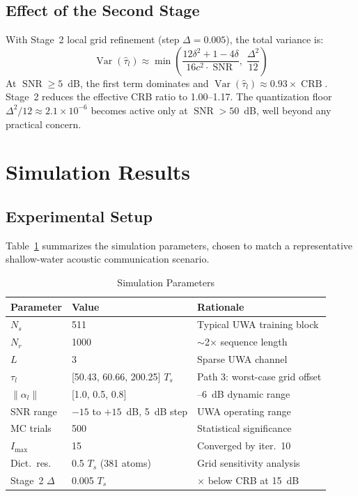 \documentclass[a4paper,fleqn]{cas-dc}
\DeclareMathOperator{\Var}{Var}
\DeclareMathOperator{\SNR}{SNR}
\DeclareMathOperator{\CRB}{CRB}
\begin{document}
\subsection{Effect of the Second Stage}

With Stage~2 local grid refinement (step $\Delta = 0.005$), the total variance is:
\begin{equation}
\Var(\hat{\tau}_l) \approx \min\!\left( \frac{12\delta^2 + 1 - 4\delta}{16c^2 \cdot \SNR}, \; \frac{\Delta^2}{12} \right)
\label{eq:combined}
\end{equation}
At $\SNR \ge 5$~dB, the first term dominates and $\Var(\hat{\tau}_l) \approx 0.93 \times \CRB$. Stage~2 reduces the effective CRB ratio to 1.00--1.17. The quantization floor $\Delta^2/12 \approx 2.1 \times 10^{-6}$ becomes active only at $\SNR > 50$~dB, well beyond any practical concern.

\section{Simulation Results}
\label{sec:results}

\subsection{Experimental Setup}

Table~\ref{tab:params} summarizes the simulation parameters, chosen to match a representative shallow-water acoustic communication scenario.

\begin{table}[width=.9\linewidth,cols=3,pos=h]
\centering
\caption{Simulation Parameters}
\label{tab:params}
\footnotesize
\begin{tabular}{@{}ll>{\raggedright\arraybackslash}p{2.8cm}@{}}
\toprule
Parameter & Value & Rationale \\
\midrule
$N_s$ & 511 & Typical UWA training block \\
$N_r$ & 1000 & $\sim$2$\times$ sequence length \\
$L$ & 3 & Sparse UWA channel \\
$\tau_l$ & [50.43, 60.66, 200.25] $T_s$ & Path 3: worst-case grid offset \\
$\|\alpha_l\|$ & [1.0, 0.5, 0.8] & 0--6~dB dynamic range \\
SNR range & $-15$ to $+15$~dB, 5~dB step & UWA operating range \\
MC trials & 500 & Statistical significance \\
$I_{\max}$ & 15 & Converged by iter.~10 \\
Dict.\ res.\ & 0.5 $T_s$ (381 atoms) & Grid sensitivity analysis \\
Stage~2 $\Delta$ & 0.005 $T_s$ & 10$\times$ below CRB at 15~dB \\
\bottomrule
\end{tabular}
\end{table}
\end{document}
